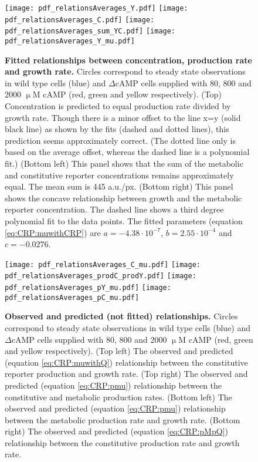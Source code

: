 \begin{figure}%
	\centering
	\texttt{[image: pdf\_relationsAverages\_Y.pdf]}
	\texttt{[image: pdf\_relationsAverages\_C.pdf]}
	\texttt{[image: pdf\_relationsAverages\_sum\_YC.pdf]}
	\texttt{[image: pdf\_relationsAverages\_Y\_mu.pdf]}		
	\caption{ 
		\textbf{Fitted relationships between concentration, production rate and growth rate.}
		Circles correspond to steady state observations in wild type cells (blue) and $\Delta$cAMP cells supplied with 80, 800 and 2000 $\upmu$M cAMP (red, green and yellow respectively).
		(Top) Concentration is predicted to equal production rate divided by growth rate. Though there is a minor offset to the line x=y (solid black line) as shown by the fits (dashed and dotted lines), this prediction seems approximately correct. (The dotted line only is based on the average offset, whereas the dashed line is a polynomial fit.)
		(Bottom left) This panel shows that the sum of the metabolic and constitutive reporter concentrations remains approximately equal. The mean sum is 445 a.u./px.
		(Bottom right) This panel shows the concave relationship between growth and the metabolic reporter concentration. The dashed line shows a third degree polynomial fit to the data points. The fitted parameters (equation \ref{eq:CRP:muwithCRP}) are $a=-4.38\cdot10^{-7}$, $b=2.55\cdot10^{-4}$ and $c=-0.0276$.
	}
	\label{fig:CRP:averagerelations1}
\end{figure}%

\begin{figure}%
	\centering
	\texttt{[image: pdf\_relationsAverages\_C\_mu.pdf]}
	\texttt{[image: pdf\_relationsAverages\_prodC\_prodY.pdf]}	
	\texttt{[image: pdf\_relationsAverages\_pY\_mu.pdf]}
	\texttt{[image: pdf\_relationsAverages\_pC\_mu.pdf]}	
	\caption{ 
		\textbf{Observed and predicted (not fitted) relationships.}
		Circles correspond to steady state observations in wild type cells (blue) and $\Delta$cAMP cells supplied with 80, 800 and 2000 $\upmu$M cAMP (red, green and yellow respectively).
		(Top left) The observed and predicted (equation \ref{eq:CRP:muwithQ}) relationship between the constitutive reporter production and growth rate.
		(Top right) The observed and predicted (equation \ref{eq:CRP:pmu}) relationship between the constitutive and metabolic production rates.
		(Bottom left) The observed and predicted (equation \ref{eq:CRP:pmu}) relationship between the metabolic production rate and growth rate.
		(Bottom right) The observed and predicted (equation \ref{eq:CRP:pMpQ}) relationship between the constitutive production rate and growth rate.
	}
	\label{fig:CRP:averagerelations2}
\end{figure}%



